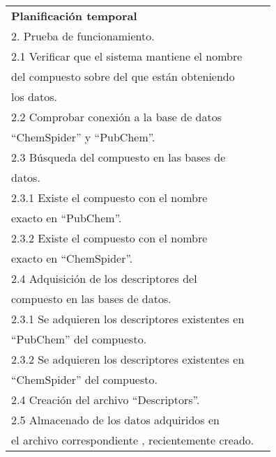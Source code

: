 \begin{longtable}{|l|l|}
\textbf{Planificación temporal}                                                        & \begin{tabular}[c]{@{}l@{}}1. Prueba de compilación.\\ 2. Prueba de funcionamiento.\\ 2.1 Verificar que el sistema mantiene el nombre \\ del compuesto sobre del que están obteniendo \\ los datos.\\ 2.2 Comprobar conexión a la base de datos \\ “ChemSpider” y “PubChem”.\\ 2.3 Búsqueda del compuesto en las bases de \\ datos.\\ 2.3.1  Existe el compuesto con el nombre \\ exacto en “PubChem”. \\ 2.3.2 Existe el compuesto con el nombre \\ exacto en “ChemSpider”.\\ 2.4 Adquisición de los descriptores del \\ compuesto en las bases de datos.\\ 2.3.1  Se adquieren  los descriptores  existentes en \\ “PubChem” del compuesto. \\ 2.3.2 Se adquieren  los descriptores  existentes en \\ “ChemSpider” del compuesto.\\ 2.4 Creación del archivo “Descriptors”.\\ 2.5 Almacenado de los datos adquiridos en \\ el archivo correspondiente , recientemente creado.\end{tabular} \\ \hline

\end{longtable}
